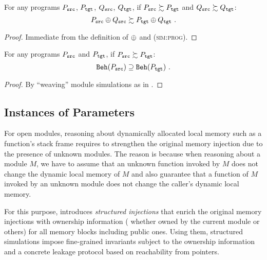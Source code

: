 \begin{theorem}[HorComp]
  For any programs $P_{\texttt{src}}$, $P_{\texttt{tgt}}$, $Q_{\texttt{src}}$, $Q_{\texttt{tgt}}$, if $P_{\texttt{src}} \succsim P_{\texttt{tgt}}$ and
  $Q_{\texttt{src}} \succsim Q_{\texttt{tgt}}$:
  \[
  \vspace{-0.8mm}
  P_\src \llink Q_\src \succsim P_\tgt \llink Q_\tgt~.
  \vspace{-0.8mm}
  \]
\end{theorem}
\begin{proof} Immediate from the definition of $\oplus$ and \textsc{(sim:prog)}.
\end{proof}
\begin{theorem}[Adequacy]
  For any programs $P_{\texttt{src}}$ and $P_{\texttt{tgt}}$, if $P_{\texttt{src}} \succsim P_{\texttt{tgt}}$:
  \[
  \vspace{-0.8mm}
  \beh{P_\src} \supseteq \beh{P_\tgt}~.
  \vspace{-0.8mm}
  \]
\end{theorem}
\begin{proof} By ``weaving'' module simulations as in \cite{pb}.
\end{proof}



\subsection{Instances of Parameters}

\label{sec:overview-verification:injection:dynamic}
%
For open modules, reasoning about dynamically allocated local memory
such as a function's stack frame requires to strengthen the original
memory injection due to the presence of unknown modules.  The reason
is because when reasoning about a module $M$, we have to assume that
an unknown function invoked by $M$ does not change the dynamic local
memory of $M$ and also guarantee that a function of $M$ invoked by an
unknown module does not change the caller's dynamic local memory.

For this purpose, \ccc{} introduces \emph{structured injections} that
enrich the original memory injections with ownership information (\ie
whether owned by the current module or others) for all memory blocks
including public ones.  Using them, structured simulations impose
fine-grained invariants subject to the ownership information and a
concrete leakage protocol based on reachability from pointers.

